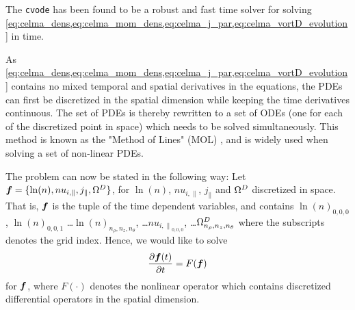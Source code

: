 The \texttt{cvode}\cite{Hindmarsh2012book} has been found to be a robust and fast time solver for solving \cref{eq:celma_dens,eq:celma_mom_dens,eq:celma_j_par,eq:celma_vortD_evolution} in time.

As \cref{eq:celma_dens,eq:celma_mom_dens,eq:celma_j_par,eq:celma_vortD_evolution} contains no mixed temporal and spatial derivatives in the equations, the PDEs can first be discretized in the spatial dimension while keeping the time derivatives continuous.
The set of PDEs is thereby rewritten to a set of ODEs (one for each of the discretized point in space) which needs to be solved simultaneously.
This method is known as the "Method of Lines" (MOL) \cite{Leveque2007book}, and is widely used when solving a set of non-linear PDEs.

The problem can now be stated in the following way:
Let $\boldsymbol{f} = \{\ln(n), nu_{i,\|}, j_\|, \Omega^D\}$, for $\ln(n)$, $nu_{i,\|}$, $j_\|$ and $\Omega^D$ discretized in space.
That is, $\boldsymbol{f}$ is the tuple of the time dependent variables, and contains $\ln(n)_{0,0,0}$, $\ln(n)_{0,0,1}$ \ldots $\ln(n)_{n_\rho,n_z,n_\theta}$, \ldots $nu_{{i,\|}_{0,0,0}}$, \ldots $\Omega^D_{n_\rho,n_z,n_\theta}$ where the subscripts denotes the grid index.
Hence, we would like to solve
%
\begin{align}
    \frac{\partial {\boldsymbol{f}(t)}}{\partial{t}} = F(\boldsymbol{f})
    \label{eq:MOL}
\end{align}
%
for $\boldsymbol{f}$, where $F(\cdot)$ denotes the nonlinear operator which contains discretized differential operators in the spatial dimension.

